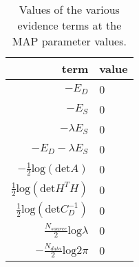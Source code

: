 \begin{table*}[!htb]\caption{Values of the various evidence terms at the MAP parameter values.}\begin{center}\begin{tabular}{ r l } term & value \\
\hline $-E_D$                                                & 0 \\ 
 $-E_S$                                                & 0 \\ 
 $-\lambda E_S$                                        & 0 \\ 
 $-E_D - \lambda E_S$                                  & 0 \\ 
 $-\frac{1}{2} \textrm{log} (\textrm{det} A )$         & 0 \\ 
 $ \frac{1}{2} \textrm{log} (\textrm{det} H^TH )$      & 0 \\ 
 $ \frac{1}{2} \textrm{log} (\textrm{det} C^{-1}_D )$  & 0 \\ 
 $ \frac{N_{source}}{2} \textrm{log} \lambda$          & 0 \\ 
 $-\frac{N_{data}}{2} \textrm{log} 2\pi$               & 0 \\ 
\hline\end{tabular}\end{center}\label{tab:2}\end{table*}